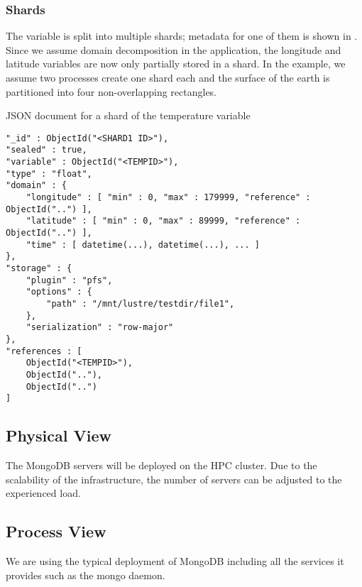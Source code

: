 \subsubsection{Shards}

The variable is split into multiple shards; metadata for one of them is shown in .
Since we assume domain decomposition in the application, the longitude and latitude variables are now only partially stored in a shard.
In the example, we assume two processes create one shard each and the surface of the earth is partitioned into four non-overlapping rectangles.

\begin{tcbcode}[label={lst:mongotemperatureshard}]{JSON document for a shard of the temperature variable}
\begin{lstlisting}
"_id" : ObjectId("<SHARD1 ID>"),
"sealed" : true,
"variable" : ObjectId("<TEMPID>"),
"type" : "float",
"domain" : {
	"longitude" : [ "min" : 0, "max" : 179999, "reference" : ObjectId("..") ],
	"latitude" : [ "min" : 0, "max" : 89999, "reference" : ObjectId("..") ],
	"time" : [ datetime(...), datetime(...), ... ]
},
"storage" : {
	"plugin" : "pfs",
	"options" : {
		"path" : "/mnt/lustre/testdir/file1",
	},
	"serialization" : "row-major"
},
"references : [
	ObjectId("<TEMPID>"),
	ObjectId(".."),
	ObjectId("..")
]
\end{lstlisting}
\end{tcbcode}


\subsection{Physical View}
\label{backend: mongo/physical}

The MongoDB servers will be deployed on the HPC cluster.
Due to the scalability of the infrastructure, the number of servers can be adjusted to the experienced load.


\subsection{Process View}
\label{backend: mongo/process}

We are using the typical deployment of MongoDB including all the services it provides such as the mongo daemon.

